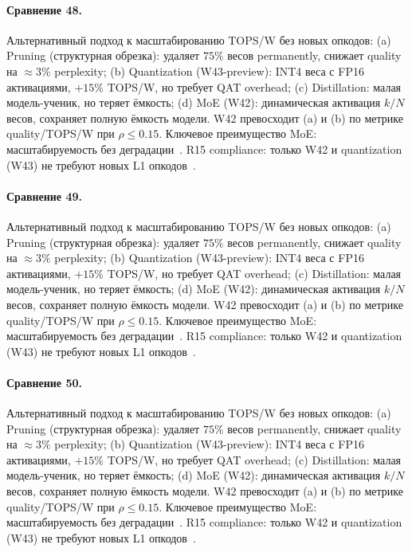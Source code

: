 \paragraph{Сравнение 48.} Альтернативный подход к масштабированию TOPS/W без новых опкодов: (a) Pruning (структурная обрезка): удаляет $75\%$ весов permanently, снижает quality на $\approx 3\%$ perplexity; (b) Quantization (W43-preview): INT4 веса с FP16 активациями, $+15\%$ TOPS/W, но требует QAT overhead; (c) Distillation: малая модель-ученик, но теряет ёмкость; (d) MoE (W42): динамическая активация $k/N$ весов, сохраняет полную ёмкость модели. W42 превосходит (a) и (b) по метрике quality/TOPS/W при $\rho \leq 0{.}15$. Ключевое преимущество MoE: масштабируемость без деградации~\cite{switch_transformer2021,mixtral2024}. R15 compliance: только W42 и quantization (W43) не требуют новых L1 опкодов~\cite{lee_gvsu_proof2021}.

\paragraph{Сравнение 49.} Альтернативный подход к масштабированию TOPS/W без новых опкодов: (a) Pruning (структурная обрезка): удаляет $75\%$ весов permanently, снижает quality на $\approx 3\%$ perplexity; (b) Quantization (W43-preview): INT4 веса с FP16 активациями, $+15\%$ TOPS/W, но требует QAT overhead; (c) Distillation: малая модель-ученик, но теряет ёмкость; (d) MoE (W42): динамическая активация $k/N$ весов, сохраняет полную ёмкость модели. W42 превосходит (a) и (b) по метрике quality/TOPS/W при $\rho \leq 0{.}15$. Ключевое преимущество MoE: масштабируемость без деградации~\cite{switch_transformer2021,mixtral2024}. R15 compliance: только W42 и quantization (W43) не требуют новых L1 опкодов~\cite{lee_gvsu_proof2021}.

\paragraph{Сравнение 50.} Альтернативный подход к масштабированию TOPS/W без новых опкодов: (a) Pruning (структурная обрезка): удаляет $75\%$ весов permanently, снижает quality на $\approx 3\%$ perplexity; (b) Quantization (W43-preview): INT4 веса с FP16 активациями, $+15\%$ TOPS/W, но требует QAT overhead; (c) Distillation: малая модель-ученик, но теряет ёмкость; (d) MoE (W42): динамическая активация $k/N$ весов, сохраняет полную ёмкость модели. W42 превосходит (a) и (b) по метрике quality/TOPS/W при $\rho \leq 0{.}15$. Ключевое преимущество MoE: масштабируемость без деградации~\cite{switch_transformer2021,mixtral2024}. R15 compliance: только W42 и quantization (W43) не требуют новых L1 опкодов~\cite{lee_gvsu_proof2021}.


